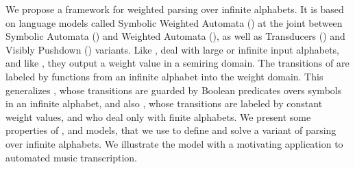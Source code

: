 %
%
We propose a framework for weighted parsing over infinite alphabets.
%
It is based on language models called Symbolic Weighted Automata (\SWA)
at the joint between Symbolic Automata (\SA) and Weighted Automata (\WA),
as well as Transducers (\SWT) and Visibly Pushdown (\SWVPA) variants.
%
Like \SA, \SWA deal with large or infinite input alphabets,
and like \WA, they output a weight value in a semiring domain.
The transitions of \SWA are labeled by functions from an infinite alphabet into the weight domain.
This generalizes \SA, whose transitions are guarded by Boolean predicates
overs symbols in an infinite alphabet,
and also \WA, whose transitions are labeled by constant weight values,
and who deal only with finite alphabets.
%
We present some properties of \SWA, \SWT and \SWVPA models,
that we use to define and solve a variant of parsing
over infinite alphabets.
%
We illustrate the model with a motivating application to
automated music transcription.
